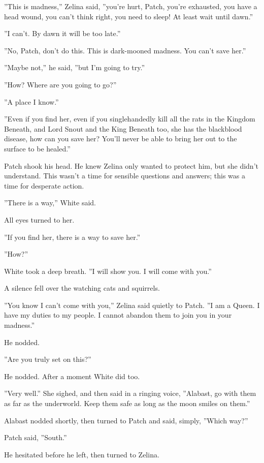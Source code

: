 \documentclass[12pt]{book}
\begin{document}
 ''This is madness,'' Zelina said, ''you're hurt, Patch, you're exhausted, you have a head wound, you can't think right, you need to sleep! At least wait until dawn.''\par
 ''I can't. By dawn it will be too late.''\par
 ''No, Patch, don't do this. This is dark-mooned madness. You can't save her.''\par
 ''Maybe not,'' he said, ''but I'm going to try.''\par
 ''How? Where are you going to go?''\par
 ''A place I know.''\par
 ''Even if you find her, even if you singlehandedly kill all the rats in the Kingdom Beneath, and Lord Snout and the King Beneath too, she has the blackblood disease, how can you save her? You'll never be able to bring her out to the surface to be healed.''\par
 Patch shook his head. He knew Zelina only wanted to protect him, but she didn't understand. This wasn't a time for sensible questions and answers; this was a time for desperate action.\par
 ''There is a way,'' White said.\par
 All eyes turned to her.\par
 ''If you find her, there is a way to save her.''\par
 ''How?''\par
 White took a deep breath. ''I will show you. I will come with you.''\par
 A silence fell over the watching cats and squirrels.\par
 ''You know I can't come with you,'' Zelina said quietly to Patch. ''I am a Queen. I have my duties to my people. I cannot abandon them to join you in your madness.''\par
 He nodded.\par
 ''Are you truly set on this?''\par
 He nodded. After a moment White did too.\par
 ''Very well.'' She sighed, and then said in a ringing voice, ''Alabast, go with them as far as the underworld. Keep them safe as long as the moon smiles on them.''\par
 Alabast nodded shortly, then turned to Patch and said, simply, ''Which way?''\par
 Patch said, ''South.''\par
 He hesitated before he left, then turned to Zelina.\par
\end{document}
